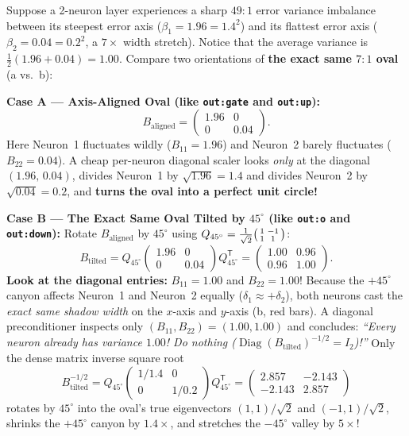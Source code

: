 \documentclass[11pt]{article}
\newcommand{\Tr}{{\mathsf{T}}}
\newcommand{\Diag}{\operatorname{Diag}}
\begin{document}
\begin{toybox}
Suppose a 2-neuron layer experiences a sharp $49:1$ error variance imbalance between its steepest error axis ($\beta_1 = 1.96 = 1.4^2$) and its flattest error axis ($\beta_2 = 0.04 = 0.2^2$, a $7\times$ width stretch). Notice that the average variance is $\frac{1}{2}(1.96 + 0.04) = 1.00$. Compare two orientations of \textbf{the exact same $7:1$ oval} (a vs.\ b):

\textbf{Case A --- Axis-Aligned Oval (like \texttt{out:gate} and \texttt{out:up}):}
\[
  B_{\mathrm{aligned}} = \begin{pmatrix} 1.96 & 0 \\ 0 & 0.04 \end{pmatrix}.
\]
Here Neuron~1 fluctuates wildly ($B_{11}=1.96$) and Neuron~2 barely fluctuates ($B_{22}=0.04$). A cheap per-neuron diagonal scaler looks \emph{only} at the diagonal $(1.96,\, 0.04)$, divides Neuron~1 by $\sqrt{1.96}=1.4$ and divides Neuron~2 by $\sqrt{0.04}=0.2$, and \textbf{turns the oval into a perfect unit circle!}

\smallskip
\textbf{Case B --- The Exact Same Oval Tilted by $45^\circ$ (like \texttt{out:o} and \texttt{out:down}):}
Rotate $B_{\mathrm{aligned}}$ by $45^\circ$ using $Q_{45^\circ} = \frac{1}{\sqrt{2}}\begin{psmallmatrix} 1 & -1 \\ 1 & 1 \end{psmallmatrix}$:
\[
  B_{\mathrm{tilted}}
  = Q_{45^\circ}\begin{pmatrix} 1.96 & 0 \\ 0 & 0.04 \end{pmatrix} Q_{45^\circ}^{\Tr}
  = \begin{pmatrix} \mathbf{1.00} & 0.96 \\ 0.96 & \mathbf{1.00} \end{pmatrix}.
\]
\textbf{Look at the diagonal entries:} $B_{11} = \mathbf{1.00}$ and $B_{22} = \mathbf{1.00}$!
Because the $+45^\circ$ canyon affects Neuron~1 and Neuron~2 equally ($\delta_1 \approx +\delta_2$), both neurons cast the \emph{exact same shadow width} on the $x$-axis and $y$-axis (b, red bars).
A diagonal preconditioner inspects only $(B_{11}, B_{22}) = (1.00, 1.00)$ and concludes: \emph{``Every neuron already has variance $1.00$! Do nothing ($\Diag(B_{\mathrm{tilted}})^{-1/2} = I_2$)!''}
Only the dense matrix inverse square root
\[
  B_{\mathrm{tilted}}^{-1/2}
  = Q_{45^\circ}\begin{pmatrix} 1/1.4 & 0 \\ 0 & 1/0.2 \end{pmatrix} Q_{45^\circ}^{\Tr}
  = \begin{pmatrix} 2.857 & -2.143 \\ -2.143 & 2.857 \end{pmatrix}
\]
rotates by $45^\circ$ into the oval's true eigenvectors $(1,1)/\sqrt{2}$ and $(-1,1)/\sqrt{2}$, shrinks the $+45^\circ$ canyon by $1.4\times$, and stretches the $-45^\circ$ valley by $5\times$!
\end{toybox}
\end{document}
